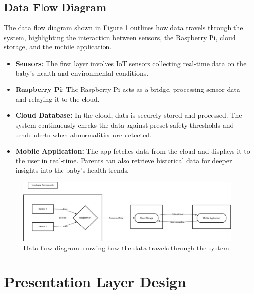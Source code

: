\documentclass[12pt,a4paper]{report}
\begin{document}
\subsection{Data Flow Diagram}
The data flow diagram shown in Figure \ref{fig:dataflow} outlines how data travels through the system, highlighting the interaction between sensors, the Raspberry Pi, cloud storage, and the mobile application.
\begin{itemize}
  \item \textbf{Sensors:} The first layer involves IoT sensors collecting real-time data on the baby’s health and environmental conditions.
  \item \textbf{Raspberry Pi:} The Raspberry Pi acts as a bridge, processing sensor data and relaying it to the cloud.
  \item \textbf{Cloud Database:} In the cloud, data is securely stored and processed. The system continuously checks the data against preset safety thresholds and sends alerts when abnormalities are detected.
  \item \textbf{Mobile Application:} The app fetches data from the cloud and displays it to the user in real-time. Parents can also retrieve historical data for deeper insights into the baby’s health trends.
\end{itemize}
\begin{figure}[hbtp]
  \centering
  \includegraphics[scale=0.35]{./pic/WhatsApp Image 2024-10-23 at 22.00.55_66baa9c8.jpg}
  \caption{Data flow diagram showing how the data travels through the system}
  \label{fig:dataflow}
\end{figure}

\section{Presentation Layer Design}
\end{document}
